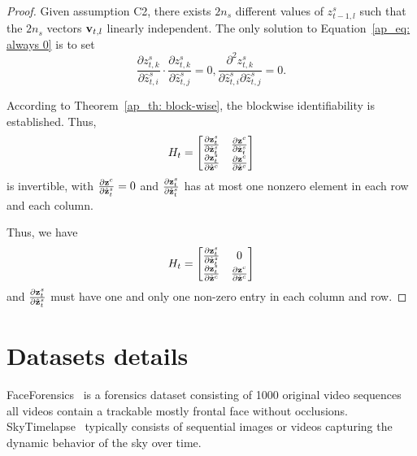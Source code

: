 \begin{proof}
    Given assumption C2, there exists $2n_s$ different values of $z_{t-1,l}^s$ such that the $2n_s$ vectors ${\mathbf{v}}_{t,l}$ linearly independent. The only solution to Equation~\ref{ap_eq: always 0} is to set 
    \begin{equation}
        \frac{\partial z_{t,k}^s}{\partial \hat{z}_{t,i}^s}\cdot
        \frac{\partial z_{t,k}^s}{\partial \hat{z}_{t,j}^s} = 0, 
        \frac{\partial^2 z_{t,k}^s}{\partial \hat{z}_{t,i}^s\partial \hat{z}_{t,j}^s} =0.
    \end{equation}

    According to Theorem~\ref{ap_th: block-wise}, the blockwise identifiability is established. Thus, 
    \begin{equation}
        H_t = \begin{bmatrix}
            \frac{\partial {\mathbf{z}}_t^s}{\partial \hat{{\mathbf{z}}}_t^s} &
            \frac{\partial {\mathbf{z}}^c}{\partial \hat{{\mathbf{z}}}_t^s} \\
            \frac{\partial {\mathbf{z}}_t^s}{\partial \hat{{\mathbf{z}}}^c} &
            \frac{\partial {\mathbf{z}}^c}{\partial \hat{{\mathbf{z}}}^c}
        \end{bmatrix}
    \end{equation}
    is invertible, with $\frac{\partial {\mathbf{z}}^c}{\partial \hat{{\mathbf{z}}}_t^s}=0$ and $\frac{\partial {\mathbf{z}}_t^s}{\partial \hat{{\mathbf{z}}}_t^s}$ has at most one nonzero element in each row and each column.

    Thus, we have
    \begin{equation}
        H_t = \begin{bmatrix}
            \frac{\partial {\mathbf{z}}_t^s}{\partial \hat{{\mathbf{z}}}_t^s} &
            0 \\
            \frac{\partial {\mathbf{z}}_t^s}{\partial \hat{{\mathbf{z}}}^c} &
            \frac{\partial {\mathbf{z}}^c}{\partial \hat{{\mathbf{z}}}^c}
        \end{bmatrix}
    \end{equation} and $\frac{\partial {\mathbf{z}}_t^s}{\partial \hat{{\mathbf{z}}}_t^s}$ must have one and only one non-zero entry in each column and row.
    

    

\end{proof}

\section{Datasets details}
\label{ap_sec: dataset details}
FaceForensics~\cite{rossler2018faceforensics} is a forensics dataset consisting of 1000 original video sequences all videos contain a trackable mostly frontal face without occlusions. SkyTimelapse~\cite{xiong2018learning} typically consists of sequential images or videos capturing the dynamic behavior of the sky over time.

